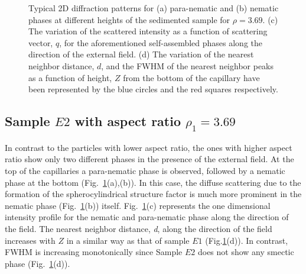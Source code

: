 \documentclass[aps,prl,preprint,superscriptaddress]{revtex4-1}
\begin{document}
\begin{figure}[t]
\caption{Typical 2D diffraction patterns for (a) para-nematic and (b) nematic phases at different heights of the sedimented sample for $\rho=3.69$. (c) The variation of the scattered intensity as a function of scattering vector, $q$, for the aforementioned self-assembled phases along the direction of the external field. (d) The variation of the nearest neighbor distance, $d$, and the FWHM of the nearest neighbor peaks as a function of height, $Z$ from the bottom of the capillary have been represented by the blue circles and the red squares respectively.}
\label{z_scan_high}
\end{figure}
\subsection{Sample $E2$ with aspect ratio $\rho_1 = 3.69$}
In contrast to the particles with lower aspect ratio, the ones with higher aspect ratio show only two different phases in the presence of the external field. At the top of the capillaries a para-nematic phase is observed, followed by a nematic phase at the bottom (Fig.~\ref{z_scan_high}(a),(b)). In this case, the diffuse scattering due to the formation of the spherocylindrical structure factor is much more prominent in the nematic phase (Fig.~\ref{z_scan_high}(b)) itself. Fig.~\ref{z_scan_high}(c) represents the one dimensional intensity profile for the nematic and para-nematic phase along the direction of the field. The nearest neighbor distance, \emph{d}, along the direction of the field increases with $Z$ in a similar way as that of sample $E1$ (Fig.\ref{z_scan_high}(d)). In contrast, FWHM is increasing monotonically since Sample $E2$ does not show any smectic phase (Fig.~\ref{z_scan_high}(d)). \par
\end{document}
